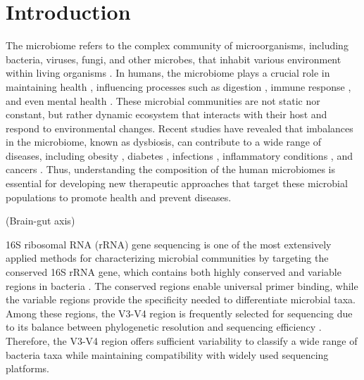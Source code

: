 \documentclass[11pt, a4paper, onecolumn, oneside]{report}
\begin{document}
    \section{Introduction}
        The microbiome refers to the complex community of microorganisms, including bacteria, viruses, fungi, and other microbes, that inhabit various environment within living organisms \cite{microbiome-1, microbiome-3}. In humans, the microbiome plays a crucial role in maintaining health \cite{microbiome-2}, influencing processes such as digestion \cite{microbiome-digestion-1}, immune response \cite{microbiome-immune-1, microbiome-immune-2, microbiome-immune-3}, and even mental health \cite{microbiome-mental-1, microbiome-mental-2, microbiome-mental-3}. These microbial communities are not static nor constant, but rather dynamic ecosystem that interacts with their host and respond to environmental changes. Recent studies have revealed that imbalances in the microbiome, known as dysbiosis, can contribute to a wide range of diseases, including obesity \cite{microbiome-obesity-1, microbiome-obesity-2, microbiome-obesity-3}, diabetes \cite{microbiome-diabetes-1, microbiome-diabetes-2, microbiome-diabetes-3}, infections \cite{microbiome-infection-1, microbiome-infection-2}, inflammatory conditions \cite{microbiome-inflammation-1, microbiome-inflammation-2, microbiome-inflammation-3}, and cancers \cite{microbiome-cancer-1, microbiome-cancer-2, microbiome-cancer-3, microbiome-cancer-4}. Thus, understanding the composition of the human microbiomes is essential for developing new therapeutic approaches that target these microbial populations to promote health and prevent diseases.

        (Brain-gut axis)

        16S ribosomal RNA (rRNA) gene sequencing is one of the most extensively applied methods for characterizing microbial communities by targeting the conserved 16S rRNA gene, which contains both highly conserved and variable regions in bacteria \cite{16S-1, 16S-2}. The conserved regions enable universal primer binding, while the variable regions provide the specificity needed to differentiate microbial taxa. Among these regions, the V3-V4 region is frequently selected for sequencing due to its balance between phylogenetic resolution and sequencing efficiency \cite{16S-3}. Therefore, the V3-V4 region offers sufficient variability to classify a wide range of bacteria taxa while maintaining compatibility with widely used sequencing platforms.
\end{document}
